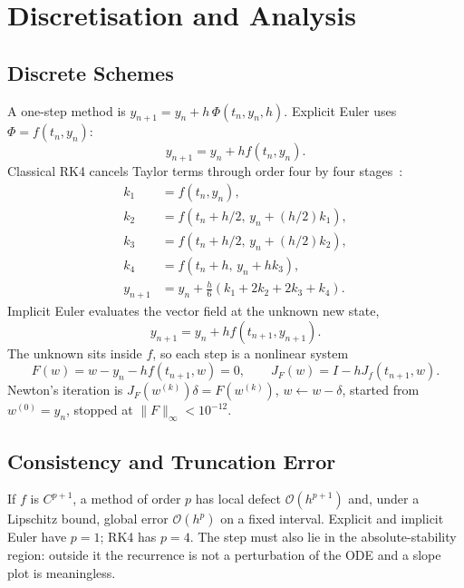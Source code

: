 \documentclass[11pt,a4paper]{article}
\begin{document}
\section{Discretisation and Analysis}
\label{sec:analysis}
\subsection{Discrete Schemes}
A one-step method is \(y_{n+1}=y_n+h\,\Phi(t_n,y_n,h)\). Explicit Euler uses \(\Phi=f(t_n,y_n)\):
\begin{equation}
y_{n+1}=y_n+h f(t_n,y_n).
\label{eq:euler}
\end{equation}
Classical RK4 cancels Taylor terms through order four by four stages~\cite{butcher2016,hairer1993}:
\begin{equation}
\begin{aligned}
k_1 &= f(t_n,y_n),\\
k_2 &= f(t_n+h/2,\, y_n+(h/2)k_1),\\
k_3 &= f(t_n+h/2,\, y_n+(h/2)k_2),\\
k_4 &= f(t_n+h,\, y_n+h k_3),\\
y_{n+1} &= y_n+\frac{h}{6}(k_1+2k_2+2k_3+k_4).
\end{aligned}
\label{eq:rk4}
\end{equation}
Implicit Euler evaluates the vector field at the unknown new state,
\begin{equation}
y_{n+1}=y_n+h f(t_{n+1},y_{n+1}).
\label{eq:ie}
\end{equation}
The unknown sits inside \(f\), so each step is a nonlinear system
\begin{equation}
F(w)=w-y_n-h f(t_{n+1},w)=0,\qquad
J_F(w)=I-h J_f(t_{n+1},w).
\label{eq:newton}
\end{equation}
Newton's iteration is \(J_F(w^{(k)})\delta=F(w^{(k)})\), \(w\leftarrow w-\delta\), started from \(w^{(0)}=y_n\), stopped at \(\|F\|_\infty<10^{-12}\).

\subsection{Consistency and Truncation Error}
\label{sec:lte}
If \(f\) is \(C^{p+1}\), a method of order \(p\) has local defect \(\mathcal{O}(h^{p+1})\) and, under a Lipschitz bound, global error \(\mathcal{O}(h^p)\) on a fixed interval. Explicit and implicit Euler have \(p=1\); RK4 has \(p=4\). The step must also lie in the absolute-stability region: outside it the recurrence is not a perturbation of the ODE and a slope plot is meaningless.
\end{document}
